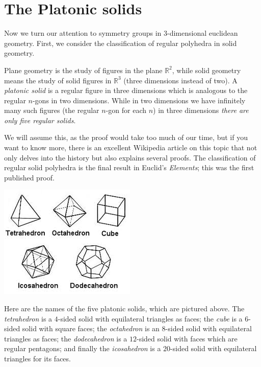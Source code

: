 \documentclass[11pt]{article}
\theoremstyle{definition}
\newcommand{\R}{\mathbb{R}} %
\begin{document}
\newpage
\section{The Platonic solids}
Now we turn our attention to symmetry groups in 3-dimensional
euclidean geometry. First, we consider the classification of regular
polyhedra in solid geometry.

Plane geometry is the study of figures in the plane $\R^2$, while
solid geometry means the study of solid figures in $\R^3$ (three
dimensions instead of two). A {\em platonic solid} is a regular figure
in three dimensions which is analogous to the regular $n$-gons in two
dimensions.  While in two dimensions we have infinitely many such
figures (the regular $n$-gon for each $n$) in three dimensions
\emph{there are only five regular solids}. 

We will assume this, as the proof would take too much of our time, but
if you want to know more, there is an excellent Wikipedia article on
this topic that not only delves into the history but also explains
several proofs. The classification of regular solid polyhedra is the
final result in Euclid's {\em Elements}; this was the first published
proof.

       \begin{center}
       \includegraphics{platonic.jpg}
       \end{center}

Here are the names of the five platonic solids, which are pictured
above.  The {\em tetrahedron} is a $4$-sided solid with equilateral
triangles as faces; the {\em cube} is a $6$-sided solid with square
faces; the {\em octahedron} is an $8$-sided solid with equilateral
triangles as faces; the {\em dodecahedron} is a $12$-sided solid with
faces which are regular pentagons; and finally the {\em icosahedron}
is a $20$-sided solid with equilateral triangles for its faces.
 
\end{document}
